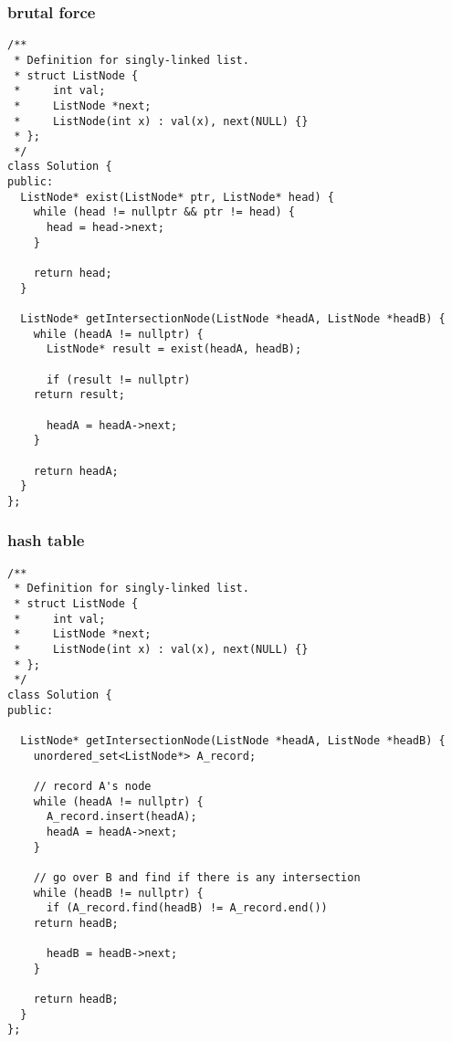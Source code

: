 \documentclass[12pt]{book}
\begin{document}
\subsubsection{brutal force}
\label{sec:org64b828f}
\begin{verbatim}
/**
 * Definition for singly-linked list.
 * struct ListNode {
 *     int val;
 *     ListNode *next;
 *     ListNode(int x) : val(x), next(NULL) {}
 * };
 */
class Solution {
public:
  ListNode* exist(ListNode* ptr, ListNode* head) {
    while (head != nullptr && ptr != head) {
      head = head->next;
    }

    return head;
  }

  ListNode* getIntersectionNode(ListNode *headA, ListNode *headB) {
    while (headA != nullptr) {
      ListNode* result = exist(headA, headB);

      if (result != nullptr)
	return result;

      headA = headA->next;
    }

    return headA;
  }
};
\end{verbatim}
\subsubsection{hash table}
\label{sec:org43b3ca0}
\begin{verbatim}
/**
 * Definition for singly-linked list.
 * struct ListNode {
 *     int val;
 *     ListNode *next;
 *     ListNode(int x) : val(x), next(NULL) {}
 * };
 */
class Solution {
public:

  ListNode* getIntersectionNode(ListNode *headA, ListNode *headB) {
    unordered_set<ListNode*> A_record;

    // record A's node 
    while (headA != nullptr) {
      A_record.insert(headA);
      headA = headA->next;
    }

    // go over B and find if there is any intersection
    while (headB != nullptr) {
      if (A_record.find(headB) != A_record.end())
	return headB;

      headB = headB->next;
    }

    return headB;
  }
};
\end{verbatim}
\end{document}
